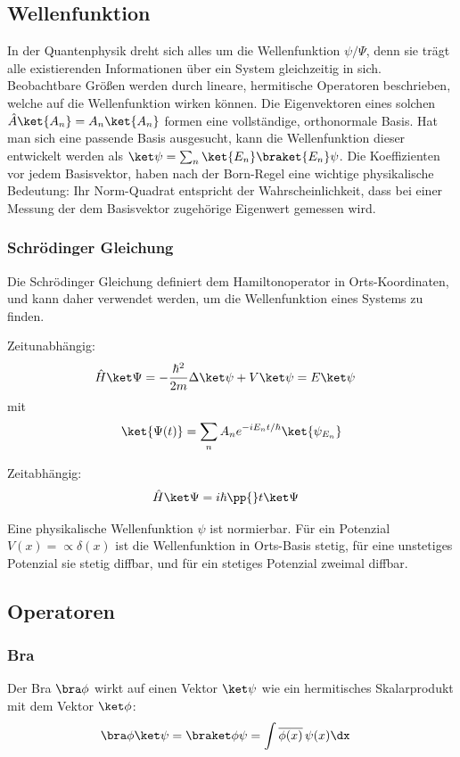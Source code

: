 \documentclass[twocolumn, unnumberedsubsub]{summery_3.1}
\begin{document}
\subsection{Wellenfunktion}
In der Quantenphysik dreht sich alles um die Wellenfunktion \(\psi/\Psi\), denn sie trägt alle existierenden Informationen 
über ein System gleichzeitig in sich.  
Beobachtbare Größen werden durch lineare, hermitische Operatoren beschrieben, welche auf die Wellenfunktion
wirken können.
Die Eigenvektoren eines solchen  \(\hat A \ket {A_n} = A_n\ket{A_n} \) formen eine 
vollständige, orthonormale Basis. Hat man sich eine passende Basis ausgesucht, 
kann die Wellenfunktion dieser entwickelt werden als 
\(\ket \psi = \sum_n \ket{E_n} \braket{E_n}\psi \).
Die Koeffizienten vor jedem Basisvektor, haben nach der Born-Regel eine wichtige physikalische Bedeutung:
Ihr Norm-Quadrat entspricht der Wahrscheinlichkeit, dass bei einer Messung der dem Basisvektor 
zugehörige Eigenwert gemessen wird.

\subsubsection{Schrödinger Gleichung}
Die Schrödinger Gleichung definiert dem Hamiltonoperator in Orts-Koordinaten, und kann daher verwendet werden,
um die Wellenfunktion eines Systems zu finden.

Zeitunabhängig:
\begin{align*}
        \hat H\ket \Psi&= 
        -\frac{\hbar ^2}{2m} \Delta \ket\psi + V \ket\psi
        =E\ket\psi
\end{align*}
mit \begin{align*}
    \ket{\Psi(t)} = \sum_{n} A_n e^{ {-iE_n t}/\hbar} \ket{\psi_{E_n}}
\end{align*}

Zeitabhängig:
\begin{align*}
    \hat H\ket \Psi &= i\hbar \pp{}t\ket\Psi
\end{align*}

Eine physikalische Wellenfunktion \(\psi\) ist normierbar. Für ein Potenzial \(V(x)=\propto \delta(x)\)
ist die Wellenfunktion in Orts-Basis stetig, für eine unstetiges Potenzial sie stetig diffbar, und 
für ein stetiges Potenzial zweimal diffbar.

\subsection{Operatoren}
\subsubsection{Bra}
Der Bra \(\bra \phi\) wirkt auf einen Vektor \(\ket\psi\) wie ein hermitisches Skalarprodukt
mit dem Vektor \(\ket \phi\):
\begin{align*}
    \bra \phi\ket \psi &= \braket \phi\psi = \int \overline{\phi(x)}\,\psi(x)\dx
\end{align*}
\end{document}

